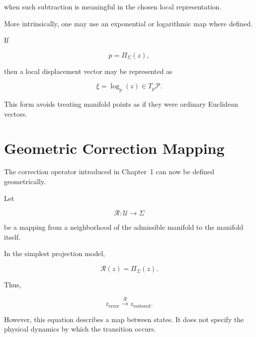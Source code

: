 \documentclass[12pt,oneside]{book}
\newcommand{\Corr}{\mathcal{R}}
\begin{document}
when such subtraction is meaningful in the chosen local
representation.

More intrinsically, one may use an exponential or logarithmic
map where defined.

If

\begin{equation}
    p
    =
    \Pi_{\Sigma}(z),
\end{equation}

then a local displacement vector may be represented as

\begin{equation}
    \xi
    =
    \log_p(z)
    \in
    T_p\mathcal{P}.
    \label{eq:intrinsic-error-vector}
\end{equation}

This form avoids treating manifold points as if they were
ordinary Euclidean vectors.


\section{Geometric Correction Mapping}
\label{sec:geometric-correction-mapping}

The correction operator introduced in Chapter~1 can now be
defined geometrically.

Let

\begin{equation}
    \Corr:
    \mathcal{U}
    \rightarrow
    \Sigma
    \label{eq:geometric-correction-operator}
\end{equation}

be a mapping from a neighborhood of the admissible manifold to
the manifold itself.

In the simplest projection model,

\begin{equation}
    \Corr(z)
    =
    \Pi_{\Sigma}(z).
    \label{eq:correction-as-projection}
\end{equation}

Thus,

\begin{equation}
    z_{\mathrm{error}}
    \xrightarrow{\Corr}
    z_{\mathrm{restored}}.
    \label{eq:error-restoration-map}
\end{equation}

However, this equation describes a map between states. It does
not specify the physical dynamics by which the transition
occurs.
\end{document}
